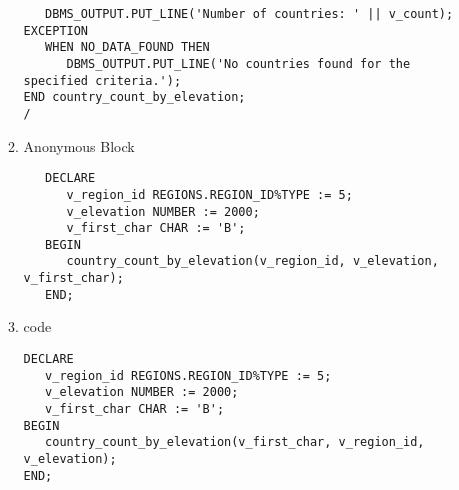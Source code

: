 \documentclass[11pt]{article}
\begin{document}
\begin{enumerate}
\begin{enumerate}
\begin{verbatim}
   DBMS_OUTPUT.PUT_LINE('Number of countries: ' || v_count);
EXCEPTION
   WHEN NO_DATA_FOUND THEN
      DBMS_OUTPUT.PUT_LINE('No countries found for the specified criteria.');
END country_count_by_elevation;
/
\end{verbatim}

\item Anonymous Block

\begin{verbatim}
   DECLARE
      v_region_id REGIONS.REGION_ID%TYPE := 5;
      v_elevation NUMBER := 2000;
      v_first_char CHAR := 'B';
   BEGIN
      country_count_by_elevation(v_region_id, v_elevation, v_first_char);
   END;
\end{verbatim}

\item code
\begin{verbatim}
DECLARE
   v_region_id REGIONS.REGION_ID%TYPE := 5;
   v_elevation NUMBER := 2000;
   v_first_char CHAR := 'B';
BEGIN
   country_count_by_elevation(v_first_char, v_region_id, v_elevation);
END;
\end{verbatim}
\end{enumerate}
\end{enumerate}
\end{document}
